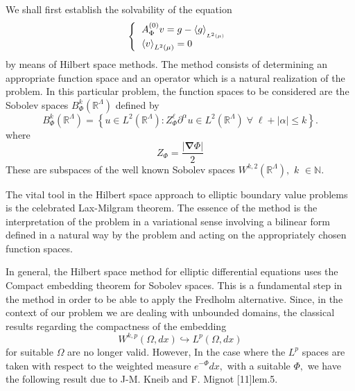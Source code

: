 \documentclass{article}
\begin{document}
We shall first establish the solvability of the equation%
\begin{equation}
\left\{ 
\begin{tabular}{l}
$A_{\Phi }^{(0)}v=g-\left\langle g\right\rangle _{_{L^{2}(\mu )}}$ \\ 
$\left\langle v\right\rangle _{L^{2}(\mu )}=0$%
\end{tabular}%
\right.
\end{equation}%
by means of Hilbert space methods. The method consists of determining an
appropriate function space and an operator which is a natural realization of
the problem. In this particular problem, the function spaces to be
considered are the Sobolev spaces $B_{\Phi }^{k}(\mathbb{R}^{\Lambda })$
defined by 
\begin{equation*}
B_{\Phi }^{k}(\mathbb{R}^{\Lambda })=\left\{ u\in L^{2}(\mathbb{R}^{\Lambda
}):Z_{\Phi }^{\ell }\partial ^{\alpha }u\in L^{2}(\mathbb{R}^{\Lambda
})\;\forall \;\ell +\left| \alpha \right| \leq k\right\} .
\end{equation*}%
where 
\begin{equation}
Z_{\Phi }=\frac{\left| \mathbf{\nabla }\Phi \right| }{2}
\end{equation}%
These are subspaces of the well known Sobolev spaces $W^{k,2}(\mathbb{R}%
^{\Lambda }),$ $k$ $\in \mathbb{N}$.

The vital tool in the Hilbert space approach to elliptic boundary value
problems is the celebrated Lax-Milgram theorem. The essence of the method is
the interpretation of the problem in a variational sense involving a
bilinear form defined in a natural way by the problem and acting on the
appropriately chosen function spaces.

In general, the Hilbert space method for elliptic differential equations
uses the Compact embedding theorem for Sobolev spaces. This is a fundamental
step in the method in order to be able to apply the Fredholm alternative.
Since, in the context of our problem we are dealing with unbounded domains,
the classical results regarding the compactness of the embedding 
\begin{equation}
W^{k,p}(\Omega ,dx)\hookrightarrow L^{p}(\Omega ,dx)
\end{equation}%
for suitable $\Omega $ are no longer valid. However, In the case where the $%
L^{p}$ spaces are taken with respect to the weighted measure $e^{-\Phi }dx,$
with a suitable $\Phi ,$ we have the following result due to J-M$.$ Kneib
and F. Mignot [11]lem.5.
\end{document}

